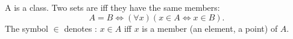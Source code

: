 A  is a class. Two sets are  iff they have the same members:
$$
A = B \iff (\forall x)(x \in A \iff x \in B).
$$
The symbol $\in$ denotes : $x \in A$ iff $x$ is a member (an element, a point) of $A$.
